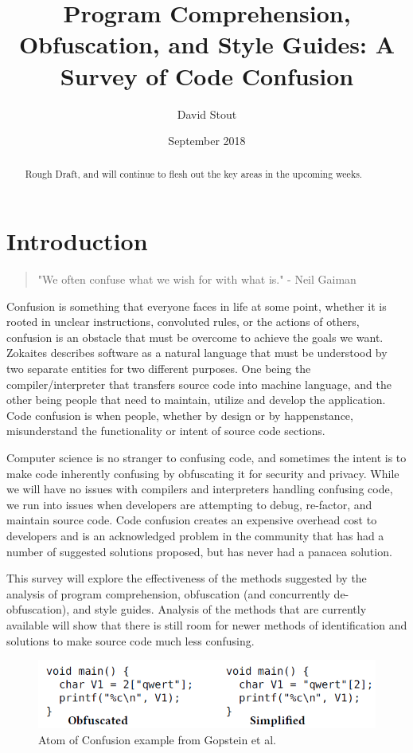 \documentclass[a4paper, 10pt]{IEEEtran}
\title{\LARGE Program Comprehension, Obfuscation, and Style Guides: A Survey of Code Confusion}
\author{David Stout}
\date{September 2018}
\begin{document}
\maketitle
\begin{abstract}
Rough Draft, and will continue to flesh out the key areas in the upcoming weeks.
\end{abstract}
\section{Introduction}
\begin{quote}
    "We often confuse what we wish for with what is." - Neil Gaiman
\end{quote}


Confusion is something that everyone faces in life at some point, whether it is rooted in unclear instructions, convoluted rules, or the actions of others, confusion is an obstacle that must be overcome to achieve the goals we want. Zokaites \cite{zokaites_writing_2002} describes software as a natural language that must be understood by two separate entities for two different purposes. One being the compiler/interpreter that transfers source code into machine language, and the other being people that need to maintain, utilize and develop the application. Code confusion is when people, whether by design or by happenstance, misunderstand the functionality or intent of source code sections. 

Computer science is no stranger to confusing code, and sometimes the intent is to make code inherently confusing by obfuscating it for security and privacy. While we will have no issues with compilers and interpreters handling confusing code, we run into issues when developers are attempting to debug, re-factor, and maintain source code. Code confusion creates an expensive overhead cost to developers and is an acknowledged problem in the community that has had a number of suggested solutions proposed, but has never had a panacea solution.

This survey will explore the effectiveness of the methods suggested by the analysis of program comprehension, obfuscation (and concurrently de-obfuscation), and style guides. Analysis of the methods that are currently available will show that there is still room for newer methods of identification and solutions to make source code much less confusing.

\begin{figure}[ht!]
\centering
\includegraphics[scale=0.45]{Confusing_Code.PNG}
\caption{Atom of Confusion example from Gopstein et al.}
\label{fig:Atom}
\end{figure}
\end{document}
